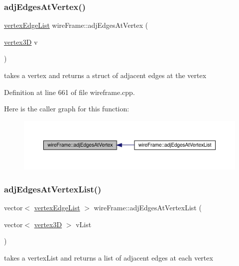 \subsubsection{\texorpdfstring{adj\+Edges\+At\+Vertex()}{adjEdgesAtVertex()}}
{\footnotesize\ttfamily \mbox{\hyperlink{structvertex_edge_list}{vertex\+Edge\+List}} wire\+Frame\+::adj\+Edges\+At\+Vertex (\begin{DoxyParamCaption}\item[{\mbox{\hyperlink{structvertex3_d}{vertex3D}}}]{v }\end{DoxyParamCaption})}

takes a vertex and returns a struct of adjacent edges at the vertex\textquotesingle{} 

Definition at line 661 of file wireframe.\+cpp.

Here is the caller graph for this function\+:
\nopagebreak
\begin{figure}[H]
\begin{center}
\leavevmode
\includegraphics[width=350pt]{classwire_frame_ae67d78b40bd171b508f9d5575121aab6_icgraph}
\end{center}
\end{figure}
\mbox{\label{classwire_frame_a06a9b12235430a64bfb612ea2697bf4c}} 
\subsubsection{\texorpdfstring{adj\+Edges\+At\+Vertex\+List()}{adjEdgesAtVertexList()}}
{\footnotesize\ttfamily vector$<$ \mbox{\hyperlink{structvertex_edge_list}{vertex\+Edge\+List}} $>$ wire\+Frame\+::adj\+Edges\+At\+Vertex\+List (\begin{DoxyParamCaption}\item[{vector$<$ \mbox{\hyperlink{structvertex3_d}{vertex3D}} $>$}]{v\+List }\end{DoxyParamCaption})}

takes a vertex\+List and returns a list of \textquotesingle{}adjacent edges at each vertex\textquotesingle{} 

